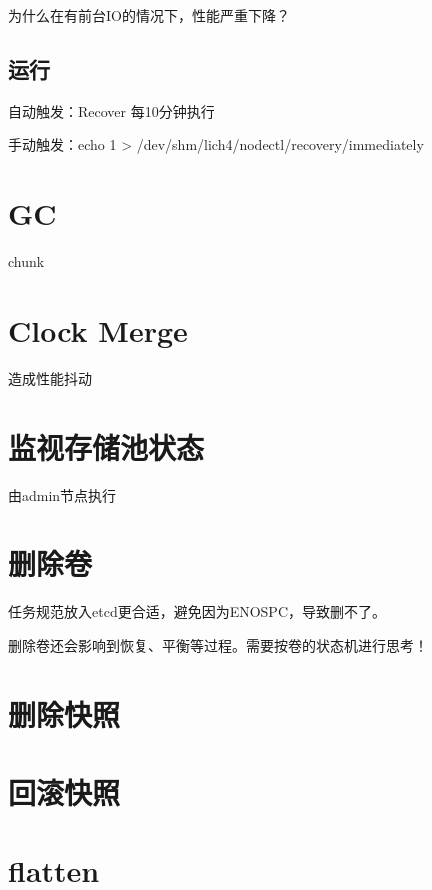 为什么在有前台IO的情况下，性能严重下降？

\subsection{运行}

\begin{tcolorbox}
    自动触发：Recover 每10分钟执行

    手动触发：echo 1 > /dev/shm/lich4/nodectl/recovery/immediately
\end{tcolorbox}

\section{GC}

chunk

\section{Clock Merge}

造成性能抖动

\section{监视存储池状态}

由admin节点执行

\section{删除卷}

任务规范放入etcd更合适，避免因为ENOSPC，导致删不了。

删除卷还会影响到恢复、平衡等过程。需要按卷的状态机进行思考！

\section{删除快照}

\section{回滚快照}

\section{flatten}




